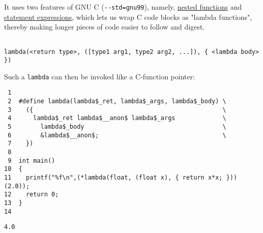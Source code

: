 \documentclass[a4paper, 12pt]{article}
\begin{document}
It uses two features of GNU C (\texttt{-{}-std=gnu99}), namely, \href{http://gcc.gnu.org/onlinedocs/gcc/Nested-Functions.html}{nested functions} and
\href{https://gcc.gnu.org/onlinedocs/gcc/Statement-Exprs.html}{statement expressions}, which lets us wrap C code blocks as "lambda
functions", thereby making longer pieces of code easier to follow and
digest.

\begin{verbatim}

lambda(<return type>, ([type1 arg1, type2 arg2, ...]), { <lambda body>  })

\end{verbatim}

Such a \texttt{lambda} can then be invoked like a C-function pointer:

\begin{verbatim}
 1
 2  #define lambda(lambda$_ret, lambda$_args, lambda$_body) \
 3    ({                                                    \
 4      lambda$_ret lambda$__anon$ lambda$_args             \
 5        lambda$_body                                      \
 6        &lambda$__anon$;                                  \
 7    })
 8
 9  int main()
10  {
11    printf("%f\n",(*lambda(float, (float x), { return x*x; }))(2.0));
12    return 0;
13  }
14
\end{verbatim}

\begin{verbatim}
4.0
\end{verbatim}
\end{document}
